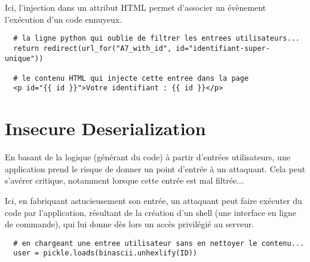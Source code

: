 \documentclass[a4paper,12pt]{article}
\begin{document}
Ici, l'injection dans un attribut HTML permet d'associer un évènement l'exécution d'un code ennuyeux.

\begin{lstlisting}
  # la ligne python qui oublie de filtrer les entrees utilisateurs...
  return redirect(url_for("A7_with_id", id="identifiant-super-unique"))

  # le contenu HTML qui injecte cette entree dans la page
  <p id="{{ id }}">Votre identifiant : {{ id }}</p>
\end{lstlisting}


\section{Insecure Deserialization}
En basant de la logique (générant du code) à partir d'entrées utilisateurs, une application prend le risque de donner un point d'entrée à un attaquant. Cela peut s'avérer critique, notamment lorsque cette entrée est mal filtrée...

Ici, en fabriquant astucieusement son entrée, un attaquant peut faire exécuter du code par l'application, résultant de la création d'un shell (une interface en ligne de commande), qui lui donne dès lors un accès privilégié au serveur.

\begin{lstlisting}
  # en chargeant une entree utilisateur sans en nettoyer le contenu...
  user = pickle.loads(binascii.unhexlify(ID))
\end{lstlisting}
\end{document}
